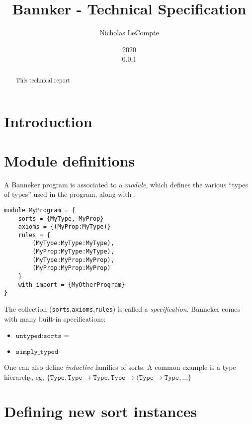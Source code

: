 \documentclass{report}
\def\version{0.0.1}
\begin{document}
\title{Bannker - Technical Specification}
\author{Nicholas LeCompte}
\date{2020 \\ \version}
\maketitle

\begin{abstract}
    This technical report 
\end{abstract}

\chapter{Introduction}

\chapter{Module definitions}

A Banneker program is associated to a \emph{module}, which defines the various ``types of types'' used in the program, along with .
\begin{verbatim}
module MyProgram = {
    sorts = {MyType, MyProp}
    axioms = {(MyProp:MyType)}
    rules = {
        (MyType:MyType:MyType),
        (MyProp:MyType:MyType),
        (MyType:MyProp:MyProp),
        (MyProp:MyProp:MyProp)
    }
    with_import = {MyOtherProgram}
}
\end{verbatim}

The collection (\texttt{sorts},\texttt{axioms},\texttt{rules}) is called a \emph{specification}. Banneker comes with many built-in specifications:
\begin{itemize}
    \item $\texttt{untyped}: \texttt{sorts = }$
    \item $\texttt{simply\_typed}$
\end{itemize}

One can also define \emph{inductive} families of sorts. A common example is a type hierarchy, eg, $\{\texttt{Type},\texttt{Type} \rightarrow \texttt{Type},\texttt{Type} \rightarrow (\texttt{Type} \rightarrow \texttt{Type}, \ldots \}$

\chapter{Defining new sort instances}
\end{document}
